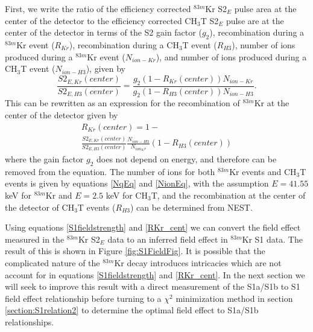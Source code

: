 First, we write the ratio of the efficiency corrected $^{83m}$Kr  S2$_E$ pulse area at the center of the detector to the efficiency corrected CH$_3$T S2$_E$ pulse are at the center of the detector in terms of the S2 gain factor ($g_2$), recombination during a $^{83m}$Kr event ($R_{Kr}$), recombination during a CH$_3$T event ($R_{H3}$), number of ions produced during a $^{83m}$Kr event ($N_{ion-Kr}$), and number of ions produced during a CH$_3$T event ($N_{ion-H3}$), given by
\begin{equation}
\frac{S2_{E,Kr}(center)}{S2_{E,H3}(center)} = \frac{g_2(1-R_{Kr}(center))N_{ion-Kr}}{g_2(1-R_{H3}(center))N_{ion-H3}}.
\end{equation}
This can be rewritten as an expression for the recombination of $^{83m}$Kr at the center of the detector given by
\begin{multline} \label{RKr_cent}
R_{Kr}(center)=1- \\ \frac{S2_{E,Kr}(center)}{S2_{E,H3}(center)}\frac{N_{ion-H3}}{N_{ion_Kr}}(1-R_{H3}(center))
\end{multline}
where the gain factor $g_2$ does not depend on energy, and therefore can be removed from the equation.  The number of ions for both $^{83m}$Kr events and CH$_3$T events is given by equations \ref{NqEq} and \ref{NionEq}, with the assumption $E=41.55$ keV for $^{83m}$Kr and $E=2.5$ keV for CH$_3$T, and the recombination at the center of the detector of CH$_3$T events ($R_{H3}$) can be determined from NEST.

Using equations \ref{S1fieldstrength} and \ref{RKr_cent} we can convert the field effect measured in the $^{83m}$Kr S2$_E$ data to an inferred field effect in $^{83m}$Kr S1 data.
The result of this is shown in Figure \ref{fig:S1FieldFig}.  It is possible that the complicated nature of the  $^{83m}$Kr decay introduces intricacies which are not account for in equations \ref{S1fieldstrength} and \ref{RKr_cent}.  In the next section we will seek to improve this result with a direct measurement of the S1a/S1b to S1 field effect relationship before turning to a $\chi^2$ minimization method in section \ref{section:S1relation2} to determine the optimal field effect to S1a/S1b relationships.


